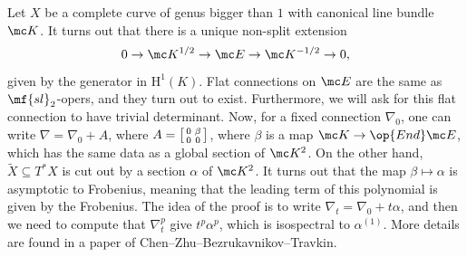 \documentclass[../notes.tex]{subfiles}
\begin{document}
\begin{example}
	Let $X$ be a complete curve of genus bigger than $1$ with canonical line bundle $\mc K$. It turns out that there is a unique non-split extension
	\[0\to\mc K^{1/2}\to\mc E\to\mc K^{-1/2}\to0,\]
	given by the generator in $\mathrm H^1(K)$. Flat connections on $\mc E$ are the same as $\mf{sl}_2$-opers, and they turn out to exist. Furthermore, we will ask for this flat connection to have trivial determinant. Now, for a fixed connection $\nabla_0$, one can write $\nabla=\nabla_0+A$, where $A=\begin{bsmallmatrix}
		0 & \beta \\ 0 & 0
	\end{bsmallmatrix}$, where $\beta$ is a map $\mc K\to\op{End}\mc E$, which has the same data as a global section of $\mc K^2$. On the other hand, $\widetilde X\subseteq T^*X$ is cut out by a section $\alpha$ of $\mc K^2$. It turns out that the map $\beta\mapsto\alpha$ is asymptotic to Frobenius, meaning that the leading term of this polynomial is given by the Frobenius. The idea of the proof is to write $\nabla_t=\nabla_0+t\alpha$, and then we need to compute that $\nabla_t^p$ give $t^p\alpha^p$, which is isospectral to $\alpha^{(1)}$. More details are found in a paper of Chen--Zhu--Bezrukavnikov--Travkin.
\end{example}
\end{document}
